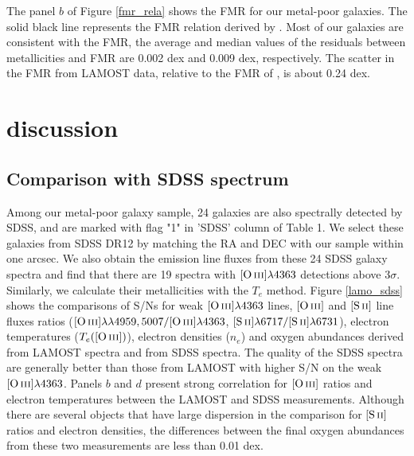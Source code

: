 \documentclass[usenatbib]{raa}
\begin{document}
The panel $b$ of Figure \ref{fmr_rela} shows the FMR for our metal-poor 
galaxies. The solid black line represents the FMR relation derived by
\cite{2013ApJ...765..140A}. Most of our galaxies are consistent 
with the FMR,  the average and median values of the 
residuals between metallicities and FMR are 0.002 dex and 0.009 dex, 
respectively. The scatter in the FMR from LAMOST 
data, relative to the FMR of \cite{2013ApJ...765..140A}, is about 0.24 dex.

\section{discussion}
\label{discussion}

\subsection{Comparison with SDSS spectrum}
\label{comp_spec}
Among our metal-poor galaxy sample, 24 galaxies are also spectrally detected
by SDSS, and are marked with flag "1" in 'SDSS' column of Table 1. We select these 
galaxies from SDSS
DR12 by matching the RA and DEC with our sample  within one arcsec.
  We also obtain the emission line fluxes from these 
24 SDSS galaxy spectra and find that there are 19 spectra with $\hbox{[O\,{\sc iii}]}\lambda4363$ 
detections above
3$\sigma$. Similarly, we calculate their metallicities with the $T_e$ 
method. Figure \ref{lamo_sdss} 
shows the comparisons of S/Ns for weak $\hbox{[O\,{\sc iii}]}\lambda4363$ lines, $\hbox{[O\,{\sc iii}]}$ and $\hbox{[S\,{\sc ii}]}$ line 
fluxes ratios 
($\hbox{[O\,{\sc iii}]}\lambda\lambda4959,5007/\hbox{[O\,{\sc iii}]}\lambda4363$, $\hbox{[S\,{\sc ii}]}\lambda6717/\hbox{[S\,{\sc ii}]}\lambda6731$), electron temperatures
($T_e(\hbox{[O\,{\sc iii}]})$), electron densities ($n_e$) and oxygen abundances  derived from LAMOST spectra and from
SDSS spectra. 
  The quality of the SDSS 
spectra are generally better than those from
    LAMOST with higher S/N on the weak $\hbox{[O\,{\sc iii}]}\lambda4363$. Panels $b$ and $d$ 
present strong correlation 
for $\hbox{[O\,{\sc iii}]}$ ratios and electron temperatures between the LAMOST and SDSS measurements.
Although there are several objects that have large dispersion in the comparison for $\hbox{[S\,{\sc ii}]}$ ratios 
and electron densities, the differences between the final oxygen abundances from these two
measurements are less than 0.01 dex.
\end{document}
